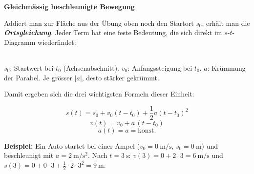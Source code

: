 \documentclass[addpoints,11pt,a4paper]{exam}
\newenvironment{theoriebox}[1][Theorie]{%
  \par\addvspace{10pt}\noindent\textbf{#1}\par\smallskip\noindent
}{%
  \par\addvspace{10pt}
}
\newlength{\antwortraumlen}
\newcommand{\Antwortraum}[1]{%
  \pgfmathsetlength{\antwortraumlen}{#1*2.5cm}%
  \begin{answerbox}
    \rule{0pt}{\antwortraumlen}%
  \end{answerbox}%
}
\begin{document}
\begin{questions}
\begin{taskbox}
\end{taskbox}
\end{questions}

\begin{theoriebox}[Gleichmässig beschleunigte Bewegung]
Addiert man zur Fläche aus der Übung oben noch den Startort $s_0$, erhält
man die \textbf{\emph{Ortsgleichung}}. Jeder Term hat eine feste
Bedeutung, die sich direkt im $s$-$t$-Diagramm wiederfindet:

\begin{center}
\\[0.2em]
{\scriptsize $s_0$: Startwert bei $t_0$ (Achsenabschnitt). $v_0$:
Anfangssteigung bei $t_0$. $a$: Krümmung der Parabel. Je grösser $|a|$,
desto stärker gekrümmt.}
\end{center}

Damit ergeben sich die drei wichtigsten Formeln dieser Einheit:

\begin{formelbox}
\[
  s(t) = s_0 + v_0(t-t_0) + \frac{1}{2}a(t-t_0)^2
\]
\[
  v(t) = v_0 + a\,(t-t_0)
\]
\[
  a(t) = a = \text{konst.}
\]
\end{formelbox}

\textbf{Beispiel:} Ein Auto startet bei einer Ampel
($v_0=\SI{0}{\meter\per\second}$, $s_0=\SI{0}{\meter}$) und beschleunigt
mit $a=\SI{2}{\meter\per\second\squared}$. Nach $t=\SI{3}{\second}$:
$v(3) = 0 + 2\cdot3 = \SI{6}{\meter\per\second}$ und
$s(3) = 0 + 0\cdot3 + \frac12\cdot2\cdot3^2 = \SI{9}{\meter}$.
\end{theoriebox}
\end{document}
